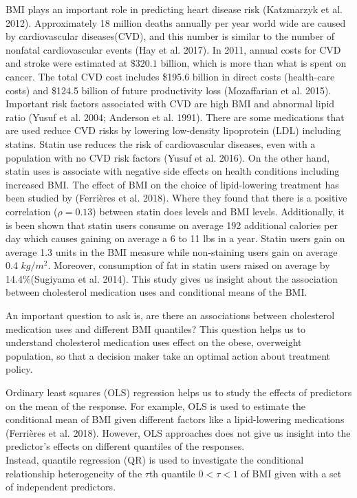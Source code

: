 \documentclass[
  12pt,
]{article}
\begin{document}
BMI plays an important role in predicting heart disease risk (Katzmarzyk et al. 2012). Approximately 18 million deaths annually per year world wide are caused by cardiovascular diseases(CVD), and this number is similar to the number of nonfatal cardiovascular events (Hay et al. 2017).
In 2011, annual costs for CVD and stroke were estimated at \(\$320.1\) billion, which is more than what is spent on cancer. The total CVD cost includes \$195.6 billion in direct costs (health-care costs) and \$124.5 billion of future productivity loss (Mozaffarian et al. 2015). Important risk factors associated with CVD are high BMI and abnormal lipid ratio (Yusuf et al. 2004; Anderson et al. 1991). There are some medications that are used reduce CVD risks by lowering low-density lipoprotein (LDL) including statins. Statin use reduces the risk of cardiovascular diseases, even with a population with no CVD risk factors (Yusuf et al. 2016). On the other hand, statin uses is associate with negative side effects on health conditions including increased BMI. The effect of BMI on the choice of lipid-lowering treatment has been studied by (Ferrières et al. 2018). Where they found that there is a positive correlation (\(\rho=0.13\)) between statin does levels and BMI levels.
Additionally, it is been shown that statin users consume on average 192 additional calories per day which causes gaining on average a 6 to 11 lbs in a year. Statin users gain on average 1.3 units in the BMI measure while non-staining users gain on average 0.4 \(kg/m^2\). Moreover, consumption of fat in statin users raised on average by 14.4\%(Sugiyama et al. 2014). This study gives us insight about the association between cholesterol medication uses and conditional means of the BMI.

An important question to ask is, are there an associations between cholesterol medication uses and different BMI quantiles? This question helps us to understand cholesterol medication uses effect on the obese, overweight population, so that a decision maker take an optimal action about treatment policy.

Ordinary least squares (OLS) regression helps us to study the effects of predictors on the mean of the response. For example, OLS is used to estimate the conditional mean of BMI given different factors like a lipid-lowering medications (Ferrières et al. 2018). However, OLS approaches does not give us insight into the predictor's effects on different quantiles of the responses.\\
Instead, quantile regression (QR) is used to investigate the conditional relationship heterogeneity of the \(\tau\)th quantile \(0<\tau<1\) of BMI given with a set of independent predictors.
\end{document}
